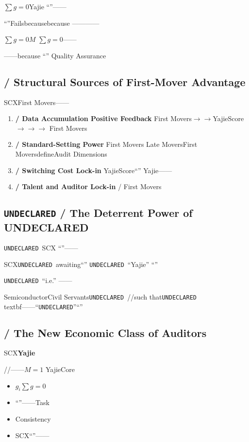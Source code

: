 \documentclass[12pt,a4paper]{article}
\theoremstyle{remark}
\newcommand{\sumgeq}{\sum g = 0}
\newcommand{\undeclared}{\texttt{UNDECLARED}}
\begin{document}
$\sumgeq$Yajie
``''——\textbf{}

``''Failsbecausebecause\textbf{}
————

$\sumgeq$$M$
$\sumgeq$——

——because
\textbf{}``''
Quality Assurance

\subsection{ / Structural Sources of First-Mover Advantage}

SCXFirst Movers——

\begin{enumerate}[leftmargin=*, label=\textbf{(\arabic*)}]
    \item \textbf{ / Data Accumulation Positive Feedback}
    First Movers$\to$$\to$YajieScore$\to$$\to$$\to$
    First Movers

    \item \textbf{ / Standard-Setting Power}
    First Movers
    Late MoversFirst MoversdefineAudit Dimensions

    \item \textbf{ / Switching Cost Lock-in}
    YajieScore``''
    Yajie——

    \item \textbf{ / Talent and Auditor Lock-in}
    /
    First Movers
\end{enumerate}

\subsection{\texorpdfstring{\undeclared}{UNDECLARED} / The Deterrent Power of UNDECLARED}

\undeclared\ SCX
``''——

SCX\undeclared\ awaiting``''
\undeclared\
``Yajie''
``''

\undeclared\ ``i.e.''
——

SemiconductorCivil Servants\undeclared\ //such that\undeclared\\textbf{}——``\undeclared''``''

\subsection{ / The New Economic Class of Auditors}

SCX\textbf{Yajie}

//——$M=1$
YajieCore

\begin{itemize}[leftmargin=*]
    \item $g_i$$\sumgeq$
    \item ``''——Task
    \item Consistency
    \item SCX``''——
\end{itemize}
\end{document}
